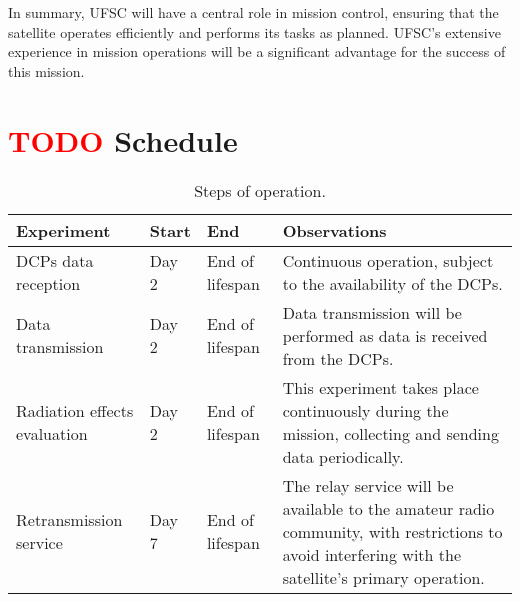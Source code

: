 In summary, UFSC will have a central role in mission control, ensuring that the satellite operates efficiently and performs its tasks as planned. UFSC's extensive experience in mission operations will be a significant advantage for the success of this mission.

\section{ \textcolor{red}{TODO} Schedule}

\begin{table}[!htb]
    \centering
    \begin{tabular}{L{3cm}llL{7cm}}
        \toprule[1.5pt]
        \textbf{Experiment} & \textbf{Start} & \textbf{End} & \textbf{Observations} \\
        \midrule
        DCPs data reception          & Day 2 & End of lifespan & Continuous operation, subject to the availability of the DCPs. \\
        Data transmission            & Day 2 & End of lifespan & Data transmission will be performed as data is received from the DCPs. \\
        Radiation effects evaluation & Day 2 & End of lifespan & This experiment takes place continuously during the mission, collecting and sending data periodically. \\
        Retransmission service       & Day 7 & End of lifespan & The relay service will be available to the amateur radio community, with restrictions to avoid interfering with the satellite's primary operation. \\
        \bottomrule[1.5pt]
    \end{tabular}
    \caption{Steps of operation.}
    \label{tab:conops-schedule}
\end{table}
